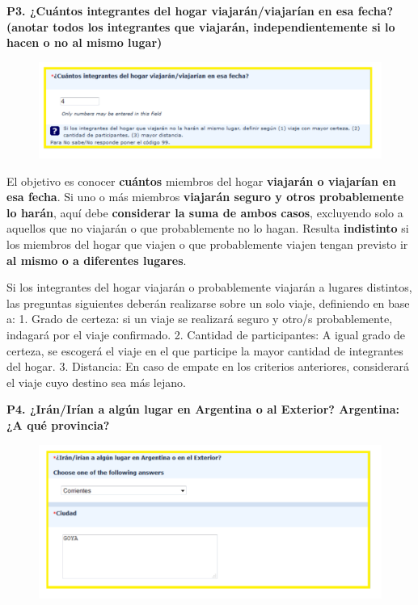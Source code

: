 \documentclass[
  openany]{book}
\begin{document}
\textbf{P3. ¿Cuántos integrantes del hogar viajarán/viajarían en esa fecha? (anotar todos los integrantes que viajarán, independientemente si lo hacen o no al mismo lugar)}

\begin{figure}

{\centering \includegraphics[width=1\linewidth]{imagenes/figura6-130} 

}

\end{figure}

El objetivo es conocer \textbf{cuántos} miembros del hogar \textbf{viajarán o viajarían en esa fecha}. Si uno o más miembros \textbf{viajarán seguro y otros probablemente lo harán}, aquí debe \textbf{considerar la suma de ambos casos}, excluyendo solo a aquellos que no viajarán o que probablemente no lo hagan. Resulta \textbf{indistinto} si los miembros del hogar que viajen o que probablemente viajen tengan previsto ir \textbf{al mismo o a diferentes lugares}.

Si los integrantes del hogar viajarán o probablemente viajarán a lugares distintos, las preguntas siguientes deberán realizarse sobre un solo viaje, definiendo en base a: 1. Grado de certeza: si un viaje se realizará seguro y otro/s probablemente, indagará por el viaje confirmado. 2. Cantidad de participantes: A igual grado de certeza, se escogerá el viaje en el que participe la mayor cantidad de integrantes del hogar. 3. Distancia: En caso de empate en los criterios anteriores, considerará el viaje cuyo destino sea más lejano.

\textbf{P4. ¿Irán/Irían a algún lugar en Argentina o al Exterior? Argentina: ¿A qué provincia?}

\begin{figure}

{\centering \includegraphics[width=1\linewidth]{imagenes/figura6-131} 

}

\end{figure}
\end{document}
